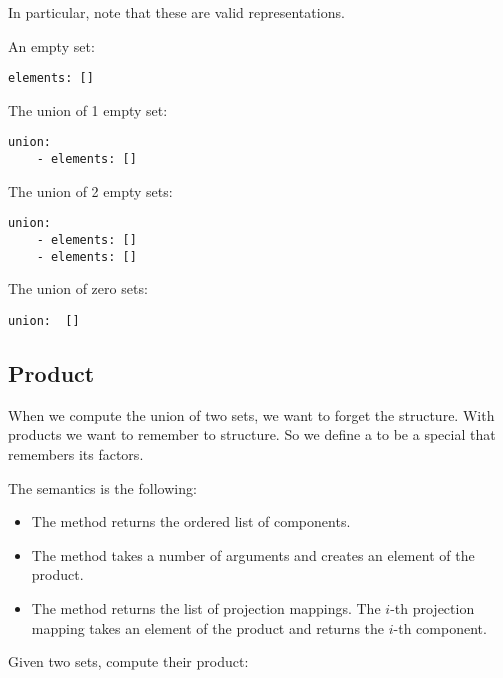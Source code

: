 In particular, note that these are valid representations.

An empty set:

\begin{verbatim}
elements: []
\end{verbatim}

The union of 1 empty set:

\begin{verbatim}
union:
    - elements: []
\end{verbatim}

The union of 2 empty sets:

\begin{verbatim}
union:
    - elements: []
    - elements: []
\end{verbatim}

The union of zero sets:

\begin{verbatim}
union:  []
\end{verbatim}

\subsection{Product}

When we compute the union of two sets, we want to forget the structure. With products we want to remember to structure.
So we define a  to be a special \Setoid that remembers its factors.


The semantics is the following:
\begin{itemize}
    \item The method  returns the ordered list of components.
    \item The method   takes a number of arguments and creates an element of the product.
    \item The method  returns the list of projection mappings.
            The $i$-th projection mapping takes an element of the product and returns the $i$-th component.

\end{itemize}


\begin{gradedexercise}
  Given two sets, compute their product:

\end{gradedexercise}

